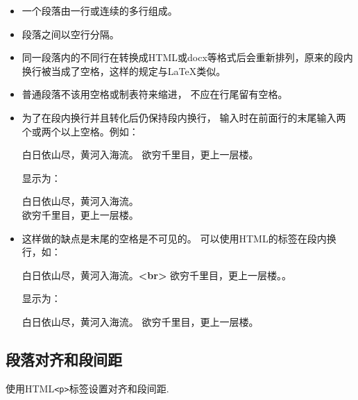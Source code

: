 \documentclass[]{ctexbook}
\newenvironment{Shaded}{\begin{snugshade}}{\end{snugshade}}
\newcommand{\KeywordTok}[1]{\textcolor[rgb]{0.13,0.29,0.53}{\textbf{#1}}}
\newcommand{\NormalTok}[1]{#1}
\begin{document}
\begin{itemize}
\item
  一个段落由一行或连续的多行组成。
\item
  段落之间以空行分隔。
\item
  同一段落内的不同行在转换成HTML或docx等格式后会重新排列，原来的段内换行被当成了空格，这样的规定与LaTeX类似。
\item
  普通段落不该用空格或制表符来缩进， 不应在行尾留有空格。
\item
  为了在段内换行并且转化后仍保持段内换行， 输入时在前面行的末尾输入两个或两个以上空格。例如：

\begin{Shaded}
\begin{Highlighting}[]
\NormalTok{白日依山尽，黄河入海流。    }
\NormalTok{欲穷千里目，更上一层楼。}
\end{Highlighting}
\end{Shaded}

  显示为：

  白日依山尽，黄河入海流。\\
  欲穷千里目，更上一层楼。
\item
  这样做的缺点是末尾的空格是不可见的。 可以使用HTML的标签在段内换行，如：

\begin{Shaded}
\begin{Highlighting}[]
\NormalTok{白日依山尽，黄河入海流。}\KeywordTok{\textless{}br\textgreater{}}
\NormalTok{欲穷千里目，更上一层楼。。}
\end{Highlighting}
\end{Shaded}

  显示为：

  白日依山尽，黄河入海流。
  欲穷千里目，更上一层楼。
\end{itemize}

\hypertarget{ux6bb5ux843dux5bf9ux9f50ux548cux6bb5ux95f4ux8ddd}{%
\subsection{段落对齐和段间距}\label{ux6bb5ux843dux5bf9ux9f50ux548cux6bb5ux95f4ux8ddd}}

使用HTML\texttt{\textless{}p\textgreater{}}标签设置对齐和段间距.
\end{document}
